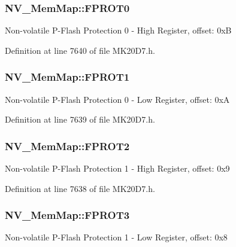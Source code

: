 \subsubsection[{\texorpdfstring{F\+P\+R\+O\+T0}{FPROT0}}]{ N\+V\+\_\+\+Mem\+Map\+::\+F\+P\+R\+O\+T0}\hypertarget{struct_n_v___mem_map_a93d4a444c27eba9b9d8939e52440e8e8}{}\label{struct_n_v___mem_map_a93d4a444c27eba9b9d8939e52440e8e8}
Non-\/volatile P-\/\+Flash Protection 0 -\/ High Register, offset\+: 0xB 

Definition at line 7640 of file M\+K20\+D7.\+h.

\subsubsection[{\texorpdfstring{F\+P\+R\+O\+T1}{FPROT1}}]{ N\+V\+\_\+\+Mem\+Map\+::\+F\+P\+R\+O\+T1}\hypertarget{struct_n_v___mem_map_a87204afdff32b371c03caafdf5a07b69}{}\label{struct_n_v___mem_map_a87204afdff32b371c03caafdf5a07b69}
Non-\/volatile P-\/\+Flash Protection 0 -\/ Low Register, offset\+: 0xA 

Definition at line 7639 of file M\+K20\+D7.\+h.

\subsubsection[{\texorpdfstring{F\+P\+R\+O\+T2}{FPROT2}}]{ N\+V\+\_\+\+Mem\+Map\+::\+F\+P\+R\+O\+T2}\hypertarget{struct_n_v___mem_map_aace11e44cee29095fe7c0bf683039f57}{}\label{struct_n_v___mem_map_aace11e44cee29095fe7c0bf683039f57}
Non-\/volatile P-\/\+Flash Protection 1 -\/ High Register, offset\+: 0x9 

Definition at line 7638 of file M\+K20\+D7.\+h.

\subsubsection[{\texorpdfstring{F\+P\+R\+O\+T3}{FPROT3}}]{ N\+V\+\_\+\+Mem\+Map\+::\+F\+P\+R\+O\+T3}\hypertarget{struct_n_v___mem_map_a944089b14b23cff0b4f8a16e13f8b9d6}{}\label{struct_n_v___mem_map_a944089b14b23cff0b4f8a16e13f8b9d6}
Non-\/volatile P-\/\+Flash Protection 1 -\/ Low Register, offset\+: 0x8 

